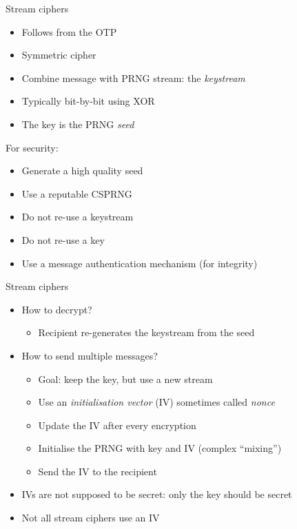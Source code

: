 \begin{frame}{Stream ciphers}
  \pause
  \begin{itemize}[<+->]
    \item Follows from the OTP
    \item Symmetric cipher
    \item Combine message with PRNG stream: the \emph{keystream}
    \item Typically bit-by-bit using XOR
    \item The key is the PRNG \emph{seed}
  \end{itemize}

  \vspace*{1em}

  \pause
  For security:
  \pause
  \begin{itemize}[<+->]
    \item Generate a high quality seed
    \item Use a reputable CSPRNG
    \item Do not re-use a keystream
    \item Do not re-use a key
    \item Use a message authentication mechanism (for integrity)
  \end{itemize}
\end{frame}

\begin{frame}{Stream ciphers}
  \begin{itemize}[<+->]
    \item How to decrypt?
    \begin{itemize}
      \item Recipient re-generates the keystream from the seed
    \end{itemize}
    \item How to send multiple messages?
    \begin{itemize}
      \item Goal: keep the key, but use a new stream
      \item Use an \emph{initialisation vector} (IV) sometimes called \emph{nonce}
      \item Update the IV after every encryption
      \item Initialise the PRNG with key and IV (complex \enquote{mixing})
      \item Send the IV to the recipient
    \end{itemize}
    \item IVs are not supposed to be secret: only the key should be secret
    \item Not all stream ciphers use an IV
  \end{itemize}
\end{frame}

